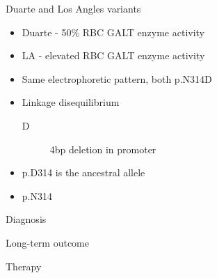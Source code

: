 \documentclass[presentation, smaller]{beamer}
\begin{document}
\begin{frame}[label={sec:org0cfcc08}]{Duarte and Los Angles variants}
\begin{itemize}
\item Duarte - 50\% RBC GALT enzyme activity
\item LA - elevated RBC GALT enzyme activity
\item Same electrophoretic pattern, both p.N314D
\item Linkage disequilibrium
\begin{description}
\item[{D}] 4bp deletion in promoter
\end{description}
\item p.D314 is the ancestral allele
\item p.N314
\end{itemize}
\end{frame}


\begin{frame}[label={sec:org4fa738a}]{Diagnosis}
\end{frame}
\begin{frame}[label={sec:org796ea05}]{Long-term outcome}
\end{frame}

\begin{frame}[label={sec:orgd0b5144}]{Therapy}
\end{frame}
\end{document}
